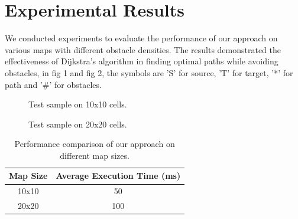 \documentclass{article}
\begin{document}
\section{Experimental Results}
We conducted experiments to evaluate the performance of our approach on various maps with different obstacle densities. The results demonstrated the effectiveness of Dijkstra's algorithm in finding optimal paths while avoiding obstacles, in fig 1 and fig 2, the symbols are 'S' for source, 'T' for target, '*' for path and '\#' for obstacles.

\begin{figure}[H]
  \centering
  \caption{Test sample on 10x10 cells.}
  \label{fig:example1}
\end{figure}

\begin{figure}[H]
  \centering
  \caption{Test sample on 20x20 cells.}
  \label{fig:example2}
\end{figure}

\begin{table}[H]
  \centering
  \caption{Performance comparison of our approach on different map sizes.}
  \vspace{6pt}
  \label{table:performance}
  \begin{tabular}{|c|c|}
    \hline
    Map Size & Average Execution Time (ms) \\
    \hline
    10x10 & 50 \\
    20x20 & 100 \\
    \hline
  \end{tabular}
  
\end{table}
\end{document}
